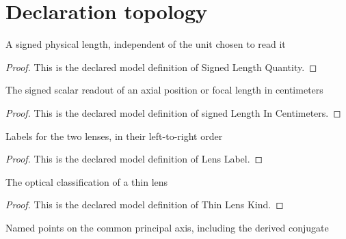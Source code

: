 \section{Declaration topology}
\begin{definition}
  \label{def:physics:phyx-mini-0148:phyxminiproblems-problemphyxmini0148-signedlengthquantity}
  A signed physical length, independent of the unit chosen to read it
\end{definition}
\begin{proof}
  This is the declared model definition of Signed Length Quantity.
\end{proof}
\begin{definition}
  \label{def:physics:phyx-mini-0148:phyxminiproblems-problemphyxmini0148-signedlengthincentimeters}
  The signed scalar readout of an axial position or focal length in centimeters
\end{definition}
\begin{proof}
  This is the declared model definition of signed Length In Centimeters.
\end{proof}
\begin{definition}
  \label{def:physics:phyx-mini-0148:phyxminiproblems-problemphyxmini0148-lenslabel}
  Labels for the two lenses, in their left-to-right order
\end{definition}
\begin{proof}
  This is the declared model definition of Lens Label.
\end{proof}
\begin{definition}
  \label{def:physics:phyx-mini-0148:phyxminiproblems-problemphyxmini0148-thinlenskind}
  The optical classification of a thin lens
\end{definition}
\begin{proof}
  This is the declared model definition of Thin Lens Kind.
\end{proof}
\begin{definition}
  \label{def:physics:phyx-mini-0148:phyxminiproblems-problemphyxmini0148-opticalaxispoint}
  Named points on the common principal axis, including the derived conjugate
\end{definition}
